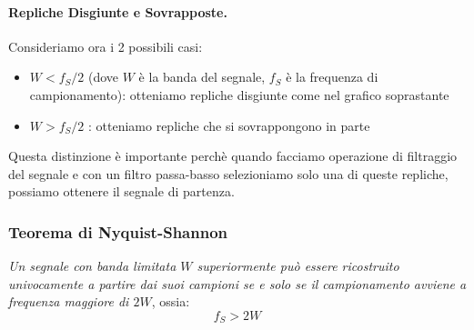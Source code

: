 \paragraph{Repliche Disgiunte e Sovrapposte.}Consideriamo ora i 2 possibili casi:
\begin{itemize}
    \item $W < f_S/2$ (dove $W$ è la banda del segnale, $f_S$ è la frequenza di campionamento): otteniamo repliche disgiunte come nel grafico soprastante
    \item $W > f_S/2$ : otteniamo repliche che si sovrappongono in parte
\end{itemize}
Questa distinzione è importante perchè quando facciamo operazione di filtraggio del segnale e con un filtro passa-basso selezioniamo
solo una di queste repliche, possiamo ottenere il segnale di partenza.\\
\bigskip
{}
\subsubsection{Teorema di Nyquist-Shannon}
\textit{Un segnale con banda limitata $W$ superiormente può essere ricostruito univocamente a partire dai suoi campioni se e solo se
 il campionamento avviene a frequenza maggiore di $2W$}, ossia:
 \begin{equation}
    f_S > 2W
 \end{equation}

